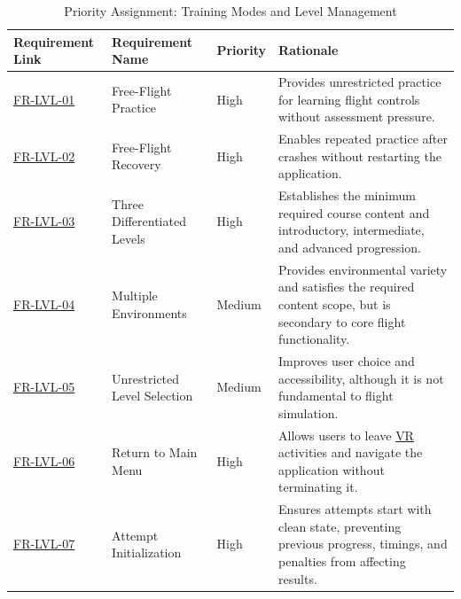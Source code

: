 \documentclass[12pt]{article}
\begin{document}
\begin{table}[htbp]
\centering
\small
\caption{Priority Assignment: Training Modes and Level Management}
\label{tab:priority-levels}
\begin{tabular}{p{2.1cm} p{2.7cm} p{1.3cm} p{7.0cm}}
\hline
\textbf{Requirement Link} & \textbf{Requirement Name} & \textbf{Priority} & \textbf{Rationale} \\
\hline
\hyperref[sec:s2-levels]{FR-LVL-01} & Free-Flight Practice & High & Provides unrestricted practice for learning flight controls without assessment pressure. \\
\hyperref[sec:s2-levels]{FR-LVL-02} & Free-Flight Recovery & High & Enables repeated practice after crashes without restarting the application. \\
\hyperref[sec:s2-levels]{FR-LVL-03} & Three Differentiated Levels & High & Establishes the minimum required course content and introductory, intermediate, and advanced progression. \\
\hyperref[sec:s2-levels]{FR-LVL-04} & Multiple Environments & Medium & Provides environmental variety and satisfies the required content scope, but is secondary to core flight functionality. \\
\hyperref[sec:s2-levels]{FR-LVL-05} & Unrestricted Level Selection & Medium & Improves user choice and accessibility, although it is not fundamental to flight simulation. \\
\hyperref[sec:s2-levels]{FR-LVL-06} & Return to Main Menu & High & Allows users to leave \hyperlink{glos:VR}{VR} activities and navigate the application without terminating it. \\
\hyperref[sec:s2-levels]{FR-LVL-07} & Attempt Initialization & High & Ensures attempts start with clean state, preventing previous progress, timings, and penalties from affecting results. \\
\hline
\end{tabular}
\end{table}
\end{document}
